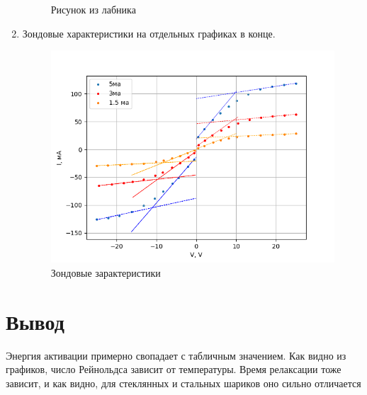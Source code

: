\documentclass[11pt,a4paper]{article}
\begin{document}
\begin{enumerate}
\begin{figure}[h!]
    \caption{Рисунок из лабника}
  \end{figure}
  \item Зондовые характеристики на отдельных графиках в конце.
  \begin{figure}[h!]
    \includegraphics*[width=\textwidth]{p2.png}
    \caption{Зондовые зарактеристики}
    \label{fig:graph.p2}
  \end{figure}
  
  
\end{enumerate}

\section*{Вывод}
Энергия активации примерно свопадает с табличным значением.
Как видно из графиков, число Рейнольдса зависит от температуры.
Время релаксации тоже зависит, и как видно, для стеклянных и стальных шариков оно сильно отличается
\end{document}
